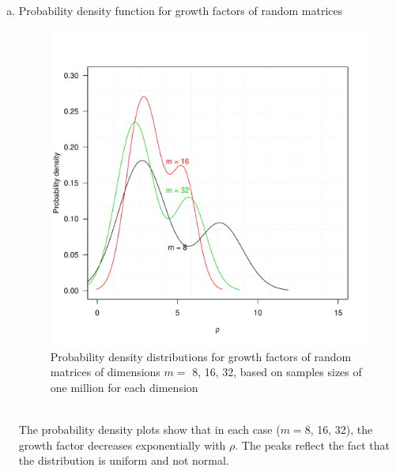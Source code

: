 \documentclass[11pt]{article}
\begin{document}
\begin{enumerate}[(a)]
\pagebreak
\item Probability density function for growth factors of random matrices
\begin{figure}[htbp]
  \begin{center}
  \includegraphics[scale =.8]{probability_density_function.pdf}
  \caption{Probability density distributions for growth factors of random matrices of dimensions  $m =$ 8, 16, 32, based on samples sizes of one million for each dimension} \label{fig:22.2} 
  \end{center}
  \end{figure}\\
The probability density plots show that in each case ($m =$8, 16, 32), the growth factor decreases exponentially with $\rho$. The peaks reflect the fact that the distribution is uniform and not normal.

\pagebreak


\end{enumerate}
\end{document}
